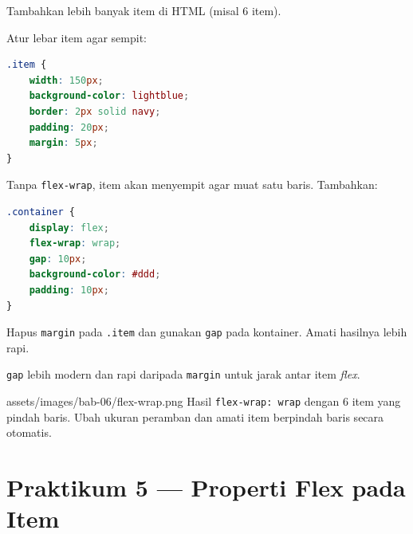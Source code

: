 \begin{langkah}
  \item Tambahkan lebih banyak item di HTML (misal 6 item).
  \item Atur lebar item agar sempit:
\end{langkah}

\begin{lstlisting}[language=CSS, caption={Lebar tetap pada item}, label={lst:item-width}]
.item {
    width: 150px;
    background-color: lightblue;
    border: 2px solid navy;
    padding: 20px;
    margin: 5px;
}
\end{lstlisting}

\begin{langkah}
  \item Tanpa \texttt{flex-wrap}, item akan menyempit agar muat satu baris. Tambahkan:
\end{langkah}

\begin{lstlisting}[language=CSS, caption={flex-wrap dan gap}, label={lst:flex-wrap}]
.container {
    display: flex;
    flex-wrap: wrap;
    gap: 10px;
    background-color: #ddd;
    padding: 10px;
}
\end{lstlisting}

\begin{langkah}
  \item Hapus \texttt{margin} pada \texttt{.item} dan gunakan \texttt{gap} pada kontainer. Amati hasilnya lebih rapi.
\end{langkah}

\begin{catatan}
\texttt{gap} lebih modern dan rapi daripada \texttt{margin} untuk jarak antar item \emph{flex}.
\end{catatan}

\begin{tangkapanlayar}
  {assets/images/bab-06/flex-wrap.png}
  {Hasil \texttt{flex-wrap: wrap} dengan 6 item yang pindah baris.}
  {Ubah ukuran peramban dan amati item berpindah baris secara otomatis.}
\end{tangkapanlayar}

\section{Praktikum 5 --- Properti Flex pada Item}
\label{sec:flex-praktik-5}

